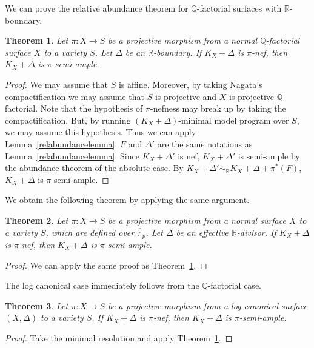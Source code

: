\documentclass[12pt,twoside]{amsart}
\newtheorem{thm}{Theorem}[section]
\theoremstyle{definition}
\newcommand{\Q}{$\mathbb{Q}$}
\begin{document}
We can prove the relative abundance theorem for 
\Q-factorial surfaces with $\mathbb{R}$-boundary. 

\begin{thm}\label{qfacrelabundance}
Let $\pi:X \to S$ be a projective morphism 
from a normal \Q-factorial surface $X$ 
to a variety $S$. 
Let $\Delta$ be an $\mathbb{R}$-boundary. 
If $K_X+\Delta$ is $\pi$-nef, then 
$K_X+\Delta$ is $\pi$-semi-ample. 
\end{thm}

\begin{proof}
We may assume that $S$ is affine. 
Moreover, by taking Nagata's compactification 
we may assume that $S$ is projective and 
$X$ is projective \Q-factorial. 
Note that the hypothesis of $\pi$-nefness 
may break up by taking the compactification. 
But, by running $(K_X+\Delta)$-minimal model program over $S$, 
we may assume this hypothesis. 
Thus we can apply Lemma~\ref{relabundancelemma}. 
$F$ and $\Delta'$ are the same notations as Lemma~\ref{relabundancelemma}. 
Since $K_X+\Delta'$ is nef, $K_X+\Delta'$ is semi-ample by 
the abundance theorem of the absolute case. 
By $K_X+\Delta' \sim_{\mathbb{R}}K_X+\Delta+\pi^*(F)$, 
$K_X+\Delta$ is $\pi$-semi-ample.
\end{proof}

We obtain the following theorem by applying the same argument. 

\begin{thm}
Let $\pi:X \to S$ be a projective morphism 
from a normal surface $X$ to a variety $S$, 
which are defined over $\overline{\mathbb{F}}_p$. 
Let $\Delta$ be an effective $\mathbb{R}$-divisor. 
If $K_X+\Delta$ is $\pi$-nef, then 
$K_X+\Delta$ is $\pi$-semi-ample. 
\end{thm}

\begin{proof}
We can apply the same proof as Theorem~\ref{qfacrelabundance}. 
\end{proof}

The log canonical case immediately follows from the \Q-factorial case.

\begin{thm}
Let $\pi:X \to S$ be a projective morphism 
from a log canonical surface $(X, \Delta)$
to a variety $S$. 
If $K_X+\Delta$ is $\pi$-nef, then 
$K_X+\Delta$ is $\pi$-semi-ample. 
\end{thm}

\begin{proof}
Take the minimal resolution and apply Theorem~\ref{qfacrelabundance}. 
\end{proof}
\end{document}
